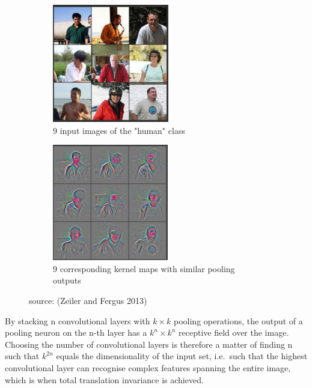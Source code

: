 \documentclass[a4paper,11pt]{article}
\begin{document}
\begin{figure}
    \centering
    \begin{minipage}[b]{\textwidth}
      \begin{subfigure}{.5\textwidth} 
        \centering
        \includegraphics[scale=0.7]{images/high_level_invariance_orig.png}
        \caption{9 input images of the "human" class}\label{fig:2b}
      \end{subfigure}%
      \begin{subfigure}{.5\textwidth} 
        \centering
        \includegraphics[scale=0.7]{images/high_level_invariance.png}
        \caption{9 corresponding kernel maps with similar pooling outputs}\label{fig:2a}
      \end{subfigure} \par \vspace*{20pt} %
    \caption{source: (Zeiler and Fergus 2013)}
    \end{minipage}%
\end{figure}

By stacking n convolutional layers with $k \times k$ pooling operations, the output of a pooling neuron on the n-th layer has a $k^n \times k^n$ receptive field over the image. Choosing the number of convolutional layers is therefore a matter of finding n such that $k^{2n}$ equals the dimensionality of the input set, i.e.\ such that the highest convolutional layer can recognise complex features spanning the entire image, which is when total translation invariance is achieved. \\
\end{document}
